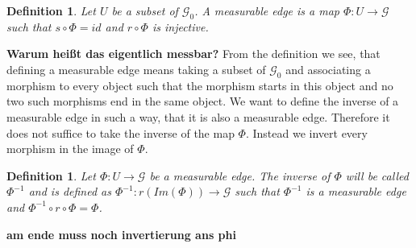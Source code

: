 \documentclass[12pt,a4paper]{scrartcl}
\newtheorem{Definition}[Theorem]{Definition}
\numberwithin{equation}{section}
\newcommand{\2}{\mathbb{Z} / 2 \mathbb{Z}}
\newcommand{\G}{\mathcal{G}}
\newcommand{\1}{\overline{1}}
\newcommand{\0}{\overline{0}}
\begin{document}
\begin{Definition}
	Let $U$ be a subset of $\G_0$. A measurable edge is a map $\Phi:U \to \G$ such that $s \circ \Phi = id$ and $r \circ \Phi$ is injective.
\end{Definition}
\textbf{Warum heißt das eigentlich messbar?}
From the definition we see, that defining a measurable edge means taking a subset of $\G_0$ and associating a morphism to every object such that the morphism starts in this object and no two such morphisms end in the same object. We want to define the inverse of a measurable edge in such a way, that it is also a measurable edge. Therefore it does not suffice to take the inverse of the map $\Phi$. Instead we invert every morphism in the image of $\Phi$.
\begin{Definition}
	Let $\Phi: U \to \G$ be a measurable edge. The inverse of $\Phi$ will be called $\Phi^{-1}$ and is defined as $\Phi^{-1}:r(Im(\Phi)) \to \G$ such that $\Phi^{-1}$ is a measurable edge and $\Phi^{-1} \circ r \circ \Phi = \Phi$.
\end{Definition}
\textbf{am ende muss noch invertierung ans phi}
\end{document}
